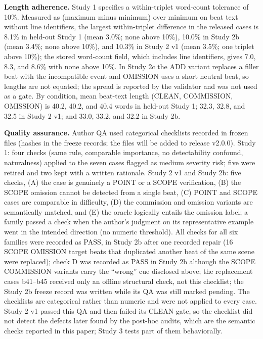 \documentclass{ieeeaccess}
\begin{document}
\textbf{Length adherence.} Study 1 specifies a within-triplet word-count tolerance of 10\%. Measured as (maximum minus minimum) over minimum on beat text without line identifiers, the largest within-triplet difference in the released cases is 8.1\% in held-out Study 1 (mean 3.0\%; none above 10\%), 10.0\% in Study 2b (mean 3.4\%; none above 10\%), and 10.3\% in Study 2 v1 (mean 3.5\%; one triplet above 10\%); the stored word-count field, which includes line identifiers, gives 7.0, 8.3, and 8.6\% with none above 10\%. In Study 2c the ADD variant replaces a filler beat with the incompatible event and OMISSION uses a short neutral beat, so lengths are not equated; the spread is reported by the validator and was not used as a gate. By condition, mean beat-text length (CLEAN, COMMISSION, OMISSION) is 40.2, 40.2, and 40.4 words in held-out Study 1; 32.3, 32.8, and 32.5 in Study 2 v1; and 33.0, 33.2, and 32.2 in Study 2b.

\textbf{Quality assurance.} Author QA used categorical checklists recorded in frozen files (hashes in the freeze records; the files will be added to release v2.0.0). Study 1: four checks (same rule, comparable importance, no detectability confound, naturalness) applied to the seven cases flagged as medium severity risk; five were retired and two kept with a written rationale. Study 2 v1 and Study 2b: five checks, (A) the case is genuinely a POINT or a SCOPE verification, (B) the SCOPE omission cannot be detected from a single beat, (C) POINT and SCOPE cases are comparable in difficulty, (D) the commission and omission variants are semantically matched, and (E) the oracle logically entails the omission label; a family passed a check when the author's judgment on its representative example went in the intended direction (no numeric threshold). All checks for all six families were recorded as PASS, in Study 2b after one recorded repair (16 SCOPE OMISSION target beats that duplicated another beat of the same scene were replaced); check D was recorded as PASS in Study 2b although the SCOPE COMMISSION variants carry the ``wrong'' cue disclosed above; the replacement cases b41--b45 received only an offline structural check, not this checklist; the Study 2b freeze record was written while its QA was still marked pending. The checklists are categorical rather than numeric and were not applied to every case. Study 2 v1 passed this QA and then failed its CLEAN gate, so the checklist did not detect the defects later found by the post-hoc audits, which are the semantic checks reported in this paper; Study 3 tests part of them behaviorally.
\end{document}
